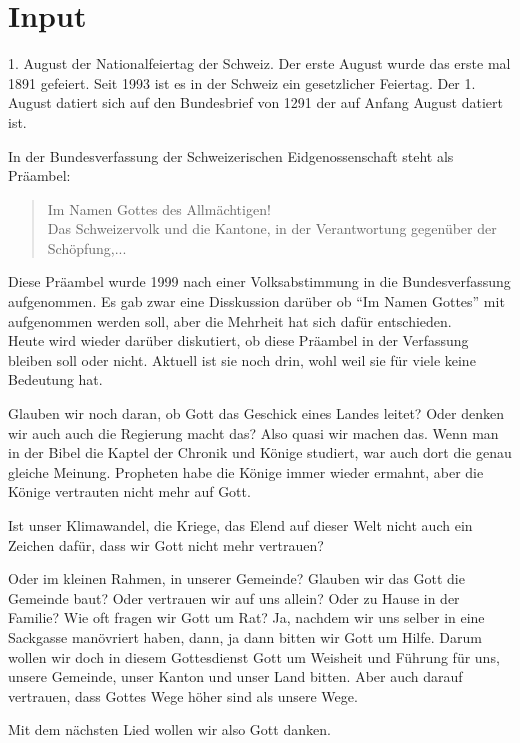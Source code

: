 \documentclass{../../inc/mybib}
\begin{document}
\section{ Input }
\begin{spacing}{1.5}
1. August der Nationalfeiertag der Schweiz. Der erste August wurde das erste mal 1891 gefeiert. Seit 1993 ist es in der Schweiz ein gesetzlicher Feiertag. Der 1. August datiert sich auf den Bundesbrief von 1291 der auf Anfang August datiert ist.

In der Bundesverfassung der Schweizerischen Eidgenossenschaft steht als Präambel:
\begin{quote}
Im Namen Gottes des Allmächtigen!\\
Das Schweizervolk und die Kantone, in der Verantwortung gegenüber der Schöpfung,...
\end{quote}
Diese Präambel wurde 1999 nach einer Volksabstimmung in die Bundesverfassung aufgenommen. Es gab zwar eine Disskussion darüber ob \enquote{Im Namen Gottes} mit aufgenommen werden soll, aber die Mehrheit hat sich dafür entschieden.\\
Heute wird wieder darüber diskutiert, ob diese Präambel in der Verfassung bleiben soll oder nicht. Aktuell ist sie noch drin, wohl weil sie für viele keine Bedeutung hat.

Glauben wir noch daran, ob Gott das Geschick eines Landes leitet? Oder denken wir auch auch die Regierung macht das? Also quasi wir machen das. Wenn man in der Bibel die Kaptel der Chronik und Könige studiert, war auch dort die genau gleiche Meinung. Propheten habe die Könige immer wieder ermahnt, aber die Könige vertrauten nicht mehr auf Gott.

Ist unser Klimawandel, die Kriege, das Elend auf dieser Welt nicht auch ein Zeichen dafür, dass wir Gott nicht mehr vertrauen?

Oder im kleinen Rahmen, in unserer Gemeinde? Glauben wir das Gott die Gemeinde baut? Oder vertrauen wir auf uns allein? Oder zu Hause in der Familie? Wie oft fragen wir Gott um Rat? Ja, nachdem wir uns selber in eine Sackgasse manövriert haben, dann, ja dann bitten wir Gott um Hilfe. Darum wollen wir doch in diesem Gottesdienst Gott um Weisheit und Führung für uns, unsere Gemeinde, unser Kanton und unser Land bitten. Aber auch darauf vertrauen, dass Gottes Wege höher sind als unsere Wege.

Mit dem nächsten Lied wollen wir also Gott danken.
\end{spacing}
\end{document}
